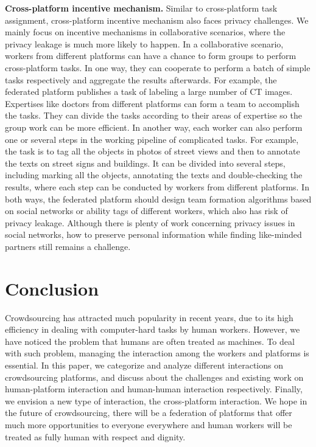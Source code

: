 \documentclass[11pt]{article}
\newcommand{\fakeparagraph}[1]{\vspace{1mm}\noindent\textbf{#1.}}
\begin{document}
\fakeparagraph{Cross-platform incentive mechanism}
Similar to cross-platform task assignment, cross-platform incentive mechanism also faces privacy challenges.
We mainly focus on incentive mechanisms in collaborative scenarios, where the privacy leakage is much more likely to happen.
In a collaborative scenario, workers from different platforms can have a chance to form groups to perform cross-platform tasks.
In one way, they can cooperate to perform a batch of simple tasks respectively and aggregate the results afterwards.
For example, the federated platform publishes a task of labeling a large number of CT images.
Expertises like doctors from different platforms can form a team to accomplish the tasks.
They can divide the tasks according to their areas of expertise so the group work can be more efficient. 
In another way, each worker can also perform one or several steps in the working pipeline of complicated tasks.
For example, the task is to tag all the objects in photos of street views and then to annotate the texts on street signs and buildings.
It can be divided into several steps, including marking all the objects, annotating the texts and double-checking the results, where each step can be conducted by workers from different platforms.
In both ways, the federated platform should design team formation algorithms based on social networks or ability tags of different workers, which also has risk of privacy leakage.
Although there is plenty of work concerning privacy issues in social networks, how to preserve personal information while finding like-minded partners still remains a challenge. 

\section{Conclusion}
Crowdsourcing has attracted much popularity in recent years, due to its high efficiency in dealing with computer-hard tasks by human workers.
However, we have noticed the problem that humans are often treated as machines.
To deal with such problem, managing the interaction among the workers and platforms is essential.
In this paper, we categorize and analyze different interactions on crowdsourcing platforms, and discuss about the challenges and existing work on human-platform interaction and human-human interaction respectively.
Finally, we envision a new type of interaction, the cross-platform interaction. 
We hope in the future of crowdsourcing, there will be a federation of platforms that offer much more opportunities to everyone everywhere and human workers will be treated as fully human with respect and dignity.
\end{document}
